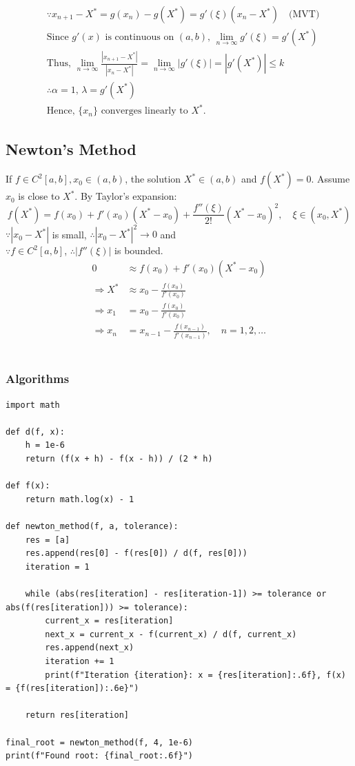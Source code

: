 \documentclass[12pt, a4paper]{article}
\makeatletter
\theoremstyle{break}
\renewenvironment{proof}[1][\proofname]{\par
  \pushQED{\qed}%
  \normalfont \topsep6\p@\@plus6\p@\relax
  \trivlist
  \item[\hskip\labelsep\bfseries #1\@addpunct{.}]\mbox{}\newline\ignorespaces
}{%
  \popQED\endtrivlist\@endpefalse
}
\makeatother
\begin{document}
\begin{proof}
\begin{align*}
&\because x_{n+1} - X^* = g(x_n) - g(X^*) = g'(\xi)(x_n - X^*) \quad \text{(MVT)} \\
&\text{Since } g'(x) \text{ is continuous on } (a ,b) \text{, } \lim_{n \rightarrow \infty} g'(\xi) = g'(X^*)\\
&\text{Thus, } \lim_{n \rightarrow \infty} \frac{|x_{n+1} - X^*|}{|x_n - X^*|} = \lim_{n \rightarrow \infty} |g'(\xi)| = |g'(X^*)| \le k \\
&\therefore \alpha = 1 \text{, } \lambda = g'(X^*) \\
&\text{Hence, } \{x_n\} \text{ converges linearly to } X^*.
\end{align*}
\end{proof}

\subsection{Newton's Method}

If $f \in C^2[a ,b], x_0 \in (a,b)$, the solution $X^* \in (a ,b)$ and $f(X^*) = 0$.
Assume $x_0$ is close to $X^*$. By Taylor's expansion:
\[ f(X^*) = f(x_0) + f'(x_0)(X^* - x_0) + \frac{f''(\xi)}{2!} (X^* - x_0)^2, \quad \xi \in (x_0,X^*) \]
$\because |x_0 - X^*|$ is small, $\therefore |x_0 - X^*|^2 \rightarrow 0$ and \\ 
$\because f \in C^2[a ,b]$, $\therefore |f''(\xi)|$ is bounded.
\begin{align*}
0 &\approx f(x_0) + f'(x_0)(X^* - x_0) \\
\Rightarrow X^* &\approx x_0 - \frac{f(x_0)}{f'(x_0)} \\
\Rightarrow x_1 &= x_0 - \frac{f(x_0)}{f'(x_0)} \\
\Rightarrow x_n &= x_{n-1} - \frac{f(x_{n-1})}{f'(x_{n-1})}, \quad n = 1, 2, \dots
\end{align*}
\\
\subsubsection{Algorithms}
\begin{lstlisting}
import math

def d(f, x):
    h = 1e-6
    return (f(x + h) - f(x - h)) / (2 * h)

def f(x):
    return math.log(x) - 1

def newton_method(f, a, tolerance):
    res = [a]
    res.append(res[0] - f(res[0]) / d(f, res[0]))
    iteration = 1
    
    while (abs(res[iteration] - res[iteration-1]) >= tolerance or abs(f(res[iteration])) >= tolerance):
        current_x = res[iteration]
        next_x = current_x - f(current_x) / d(f, current_x)
        res.append(next_x)
        iteration += 1
        print(f"Iteration {iteration}: x = {res[iteration]:.6f}, f(x) = {f(res[iteration]):.6e}")

    return res[iteration]

final_root = newton_method(f, 4, 1e-6)
print(f"Found root: {final_root:.6f}")
\end{lstlisting}
\end{document}
